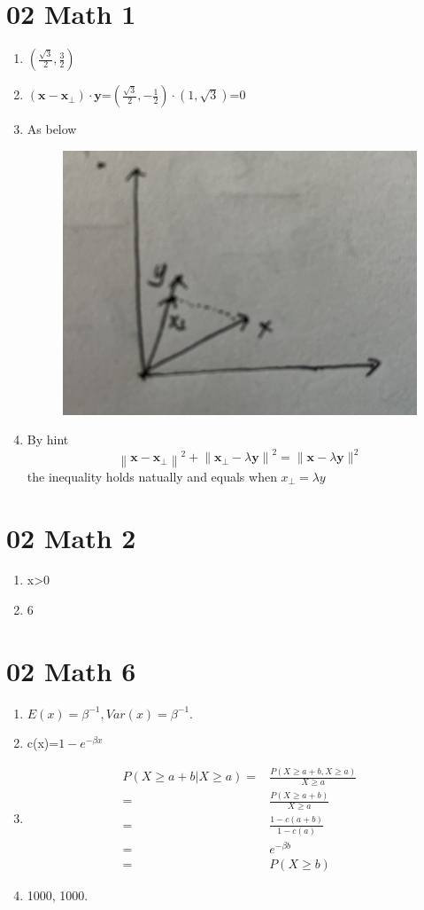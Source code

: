 \documentclass[10pt, oneside]{article}
\begin{document}
\section{02 Math 1}
\begin{enumerate}
	\item $(\frac{\sqrt{3}}{2},\frac{3}{2})$
	\item$ \left(\boldsymbol{x}-\boldsymbol{x}_{\perp}\right) \cdot \boldsymbol{y}$=$(\frac{\sqrt{3}}{2},-\frac{1}{2})\cdot(1,\sqrt{3})$=0
	\item As below
	\begin{figure}[H]
		\centering
		
		\includegraphics[width=0.5\linewidth]{1.jpeg}
		\label{1}
	\end{figure}
	\item By hint $$\left\|\boldsymbol{x}-\boldsymbol{x}_{\perp}\right\|^{2}+\left\|\boldsymbol{x}_{\perp}-\lambda \boldsymbol{y}\right\|^{2}=\|\boldsymbol{x}-\lambda \boldsymbol{y}\|^{2}$$ the inequality holds natually and equals when $x_{\perp}=\lambda y$
\end{enumerate}

\section{02 Math 2}
\begin{enumerate}
	\item x>0
	\item 6
\end{enumerate}

\section{02 Math 6}
\begin{enumerate}
	\item $E(x)=\beta^{-1}, Var(x)=\beta^{-1}.$
	\item c(x)=$1-e^{-\beta x}$
	\item $$
	\begin{aligned}
		P(X \geq a+b | X \geq a)=&\frac{P(X\geq a+b, X\geq a)}{X \geq a}\\
		=&\frac{P(X\geq a+b)}{X \geq a}\\
		=&\frac{1-c(a+b)}{1-c(a)}\\
		=&e^{-\beta b}\\
		=& P(X\geq b)
	\end{aligned}
	$$
	\item 1000, 1000.
\end{enumerate}
\end{document}
